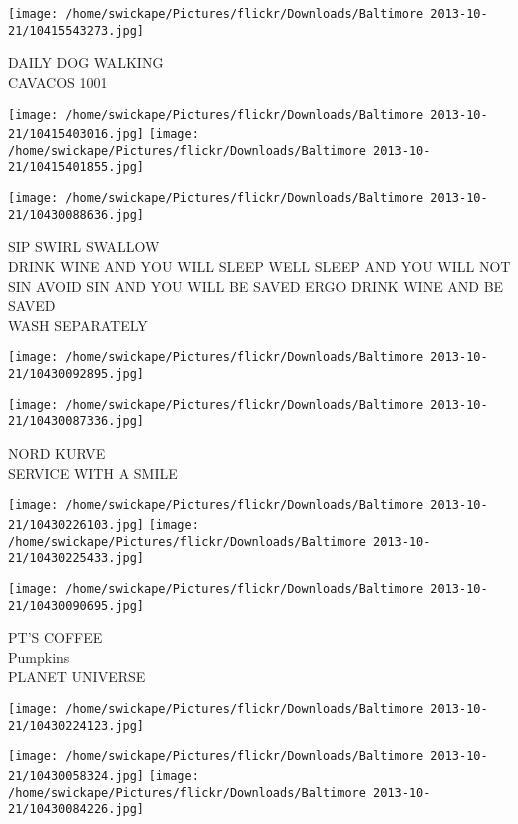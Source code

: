 \documentclass[10pt,letterpaper]{article}
\begin{document}
\vspace{0.25in}
\texttt{[image: /home/swickape/Pictures/flickr/Downloads/Baltimore 2013-10-21/10415543273.jpg]}

DAILY DOG WALKING\\
CAVACOS 1001\\
\pagebreak

\texttt{[image: /home/swickape/Pictures/flickr/Downloads/Baltimore 2013-10-21/10415403016.jpg]}
\texttt{[image: /home/swickape/Pictures/flickr/Downloads/Baltimore 2013-10-21/10415401855.jpg]}

\vspace{0.25in}
\texttt{[image: /home/swickape/Pictures/flickr/Downloads/Baltimore 2013-10-21/10430088636.jpg]}

SIP SWIRL SWALLOW\\
DRINK WINE AND YOU WILL SLEEP WELL SLEEP AND YOU WILL NOT SIN AVOID SIN AND YOU WILL BE SAVED ERGO DRINK WINE AND BE SAVED\\
WASH SEPARATELY\\
\pagebreak

\texttt{[image: /home/swickape/Pictures/flickr/Downloads/Baltimore 2013-10-21/10430092895.jpg]}

\vspace{0.25in}
\texttt{[image: /home/swickape/Pictures/flickr/Downloads/Baltimore 2013-10-21/10430087336.jpg]}

NORD KURVE\\
SERVICE WITH A SMILE\\
\pagebreak

\texttt{[image: /home/swickape/Pictures/flickr/Downloads/Baltimore 2013-10-21/10430226103.jpg]}
\texttt{[image: /home/swickape/Pictures/flickr/Downloads/Baltimore 2013-10-21/10430225433.jpg]}

\texttt{[image: /home/swickape/Pictures/flickr/Downloads/Baltimore 2013-10-21/10430090695.jpg]}

PT'S COFFEE\\
Pumpkins\\
PLANET UNIVERSE\\
\pagebreak

\texttt{[image: /home/swickape/Pictures/flickr/Downloads/Baltimore 2013-10-21/10430224123.jpg]}

\vspace{0.25in}
\texttt{[image: /home/swickape/Pictures/flickr/Downloads/Baltimore 2013-10-21/10430058324.jpg]}
\texttt{[image: /home/swickape/Pictures/flickr/Downloads/Baltimore 2013-10-21/10430084226.jpg]}
\end{document}
